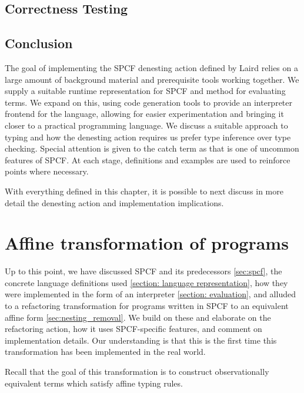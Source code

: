 \documentclass[12pt,a4paper]{report}
\theoremstyle{definition}
\theoremstyle{remark}
\begin{document}
\section{Correctness Testing}


\section{Conclusion}
The goal of implementing the SPCF denesting action defined by Laird relies on a large amount of background material and prerequisite tools working together. We supply a suitable runtime representation for SPCF and method for evaluating terms. We expand on this, using code generation tools to provide an interpreter frontend for the language, allowing for easier experimentation and bringing it closer to a practical programming language. We discuss a suitable approach to typing and how the denesting action requires us prefer type inference over type checking. Special attention is given to the catch term as that is one of uncommon features of SPCF. At each stage, definitions and examples are used to reinforce points where necessary.

With everything defined in this chapter, it is possible to next discuss in more detail the denesting action and implementation implications.

\chapter{Affine transformation of programs}\label{chapter: denesting}
Up to this point, we have discussed SPCF and its predecessors \ref{sec:spcf}, the concrete language definitions used \ref{section: language representation}, how they were implemented in the form of an interpreter \ref{section: evaluation}, and alluded to a refactoring transformation for programs written in SPCF to an equivalent affine form \ref{sec:nesting_removal}. We build on these and elaborate on the refactoring action, how it uses SPCF-specific features, and comment on implementation details. Our understanding is that this is the first time this transformation has been implemented in the real world. 

Recall that the goal of this transformation is to construct observationally equivalent terms which satisfy affine typing rules. 
\end{document}
